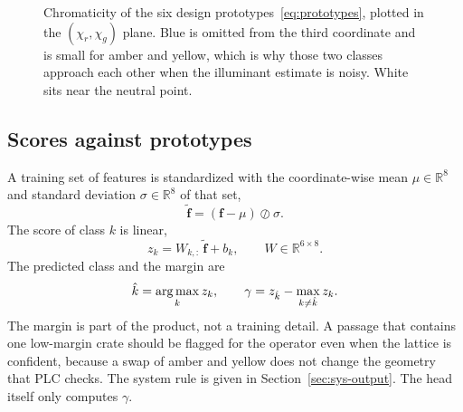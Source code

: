 \begin{figure}[t]
\centering
{}
\caption{Chromaticity of the six design prototypes~\eqref{eq:prototypes}, plotted in the $(\chi_r,\chi_g)$ plane. Blue is omitted from the third coordinate and is small for amber and yellow, which is why those two classes approach each other when the illuminant estimate is noisy. White sits near the neutral point.}
\label{fig:chroma-plane}
\end{figure}

\subsection{Scores against prototypes}
\label{sec:icph-score}

A training set of features is standardized with the coordinate-wise mean $\mu\in\mathbb{R}^{8}$ and standard deviation $\sigma\in\mathbb{R}^{8}$ of that set,
\begin{equation}
\tilde{\mathbf{f}} = (\mathbf{f}-\mu)\oslash\sigma.
\label{eq:standardize}
\end{equation}
The score of class $k$ is linear,
\begin{equation}
z_k = W_{k,:}\,\tilde{\mathbf{f}} + b_k,
\qquad
W\in\mathbb{R}^{6\times 8}.
\label{eq:linear}
\end{equation}
The predicted class and the margin are
\begin{equation}
\hat{k}=\operatorname*{arg\,max}_k z_k,
\qquad
\gamma = z_{\hat{k}} - \max_{k\neq\hat{k}} z_k.
\label{eq:margin}
\end{equation}
The margin is part of the product, not a training detail. A passage that contains one low-margin crate should be flagged for the operator even when the lattice is confident, because a swap of amber and yellow does not change the geometry that PLC checks. The system rule is given in Section~\ref{sec:sys-output}. The head itself only computes $\gamma$.

